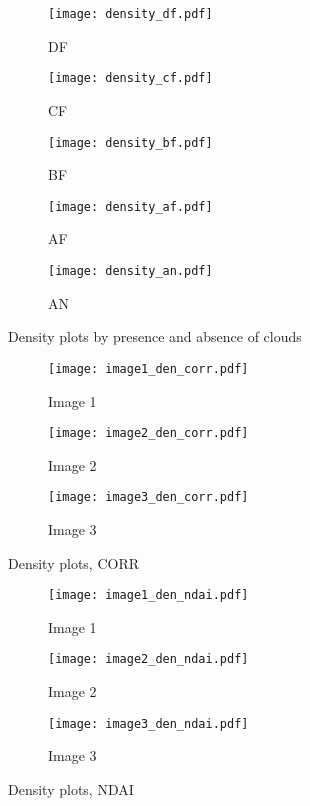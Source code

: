 \documentclass[11pt]{article}
\begin{document}
\begin{figure}[!h]
\begin{subfigure}{.33\linewidth}
  \centering
  \texttt{[image: density\_df.pdf]}
  \caption{DF}
  \label{fig:sfig1}
\end{subfigure}%
\begin{subfigure}{.33\linewidth}
  \centering
  \texttt{[image: density\_cf.pdf]}
  \caption{CF}
  \label{fig:sfig2}%
\end{subfigure}
\begin{subfigure}{.33\linewidth}
  \centering
  \texttt{[image: density\_bf.pdf]}
  \caption{BF}
  \label{fig:sfig2}
\end{subfigure}

\begin{subfigure}{.5\linewidth}
  \centering
  \texttt{[image: density\_af.pdf]}
  \caption{AF}
  \label{fig:sfig1}
\end{subfigure}%
\begin{subfigure}{.5\linewidth}
  \centering
  \texttt{[image: density\_an.pdf]}
  \caption{AN}
  \label{fig:sfig2}
\end{subfigure}
\caption{Density plots by presence and absence of clouds}
\label{fig:fig}
\end{figure}

\begin{figure}[!h]
\begin{subfigure}{.33\linewidth}
  \centering
  \texttt{[image: image1\_den\_corr.pdf]}
  \caption{Image 1}
  \label{fig:sfig1}
\end{subfigure}%
\begin{subfigure}{.33\linewidth}
  \centering
  \texttt{[image: image2\_den\_corr.pdf]}
  \caption{Image 2}
  \label{fig:sfig2}
\end{subfigure}%
\begin{subfigure}{.33\linewidth}
  \centering
  \texttt{[image: image3\_den\_corr.pdf]}
  \caption{Image 3}
  \label{fig:sfig2}
\end{subfigure}
\caption{Density plots, CORR}
\label{fig:fig}
\end{figure}

\begin{figure}[!h]
\begin{subfigure}{.33\linewidth}
  \centering
  \texttt{[image: image1\_den\_ndai.pdf]}
  \caption{Image 1}
  \label{fig:sfig1}
\end{subfigure}%
\begin{subfigure}{.33\linewidth}
  \centering
  \texttt{[image: image2\_den\_ndai.pdf]}
  \caption{Image 2}
  \label{fig:sfig2}
\end{subfigure}%
\begin{subfigure}{.33\linewidth}
  \centering
  \texttt{[image: image3\_den\_ndai.pdf]}
  \caption{Image 3}
  \label{fig:sfig2}
\end{subfigure}
\caption{Density plots, NDAI}
\label{fig:fig}
\end{figure}
\end{document}
